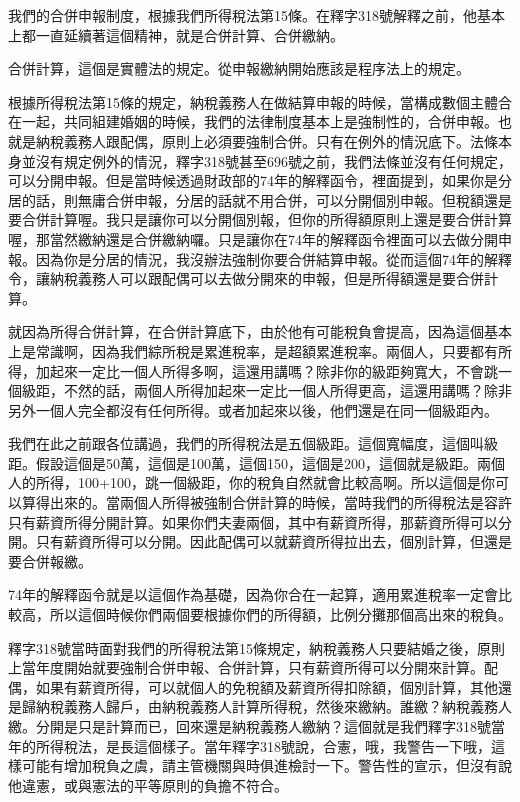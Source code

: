 \documentclass[oneside,sub3section]{ctexbook}
\begin{document}
我們的合併申報制度，根據我們所得稅法第15條。在釋字318號解釋之前，他基本上都一直延續著這個精神，就是合併計算、合併繳納。

合併計算，這個是實體法的規定。從申報繳納開始應該是程序法上的規定。

根據所得稅法第15條的規定，納稅義務人在做結算申報的時候，當構成數個主體合在一起，共同組建婚姻的時候，我們的法律制度基本上是強制性的，合併申報。也就是納稅義務人跟配偶，原則上必須要強制合併。只有在例外的情況底下。法條本身並沒有規定例外的情況，釋字318號甚至696號之前，我們法條並沒有任何規定，可以分開申報。但是當時候透過財政部的74年的解釋函令，裡面提到，如果你是分居的話，則無庸合併申報，分居的話就不用合併，可以分開個別申報。但稅額還是要合併計算喔。我只是讓你可以分開個別報，但你的所得額原則上還是要合併計算喔，那當然繳納還是合併繳納囉。只是讓你在74年的解釋函令裡面可以去做分開申報。因為你是分居的情況，我沒辦法強制你要合併結算申報。從而這個74年的解釋令，讓納稅義務人可以跟配偶可以去做分開來的申報，但是所得額還是要合併計算。

就因為所得合併計算，在合併計算底下，由於他有可能稅負會提高，因為這個基本上是常識啊，因為我們綜所稅是累進稅率，是超額累進稅率。兩個人，只要都有所得，加起來一定比一個人所得多啊，這還用講嗎？除非你的級距夠寬大，不會跳一個級距，不然的話，兩個人所得加起來一定比一個人所得更高，這還用講嗎？除非另外一個人完全都沒有任何所得。或者加起來以後，他們還是在同一個級距內。

我們在此之前跟各位講過，我們的所得稅法是五個級距。這個寬幅度，這個叫級距。假設這個是50萬，這個是100萬，這個150，這個是200，這個就是級距。兩個人的所得，100+100，跳一個級距，你的稅負自然就會比較高啊。所以這個是你可以算得出來的。當兩個人所得被強制合併計算的時候，當時我們的所得稅法是容許只有薪資所得分開計算。如果你們夫妻兩個，其中有薪資所得，那薪資所得可以分開。只有薪資所得可以分開。因此配偶可以就薪資所得拉出去，個別計算，但還是要合併報繳。

74年的解釋函令就是以這個作為基礎，因為你合在一起算，適用累進稅率一定會比較高，所以這個時候你們兩個要根據你們的所得額，比例分攤那個高出來的稅負。

釋字318號當時面對我們的所得稅法第15條規定，納稅義務人只要結婚之後，原則上當年度開始就要強制合併申報、合併計算，只有薪資所得可以分開來計算。配偶，如果有薪資所得，可以就個人的免稅額及薪資所得扣除額，個別計算，其他還是歸納稅義務人歸戶，由納稅義務人計算所得稅，然後來繳納。誰繳？納稅義務人繳。分開是只是計算而已，回來還是納稅義務人繳納？這個就是我們釋字318號當年的所得稅法，是長這個樣子。當年釋字318號說，合憲，哦，我警告一下哦，這樣可能有增加稅負之虞，請主管機關與時俱進檢討一下。警告性的宣示，但沒有說他違憲，或與憲法的平等原則的負擔不符合。
\end{document}
